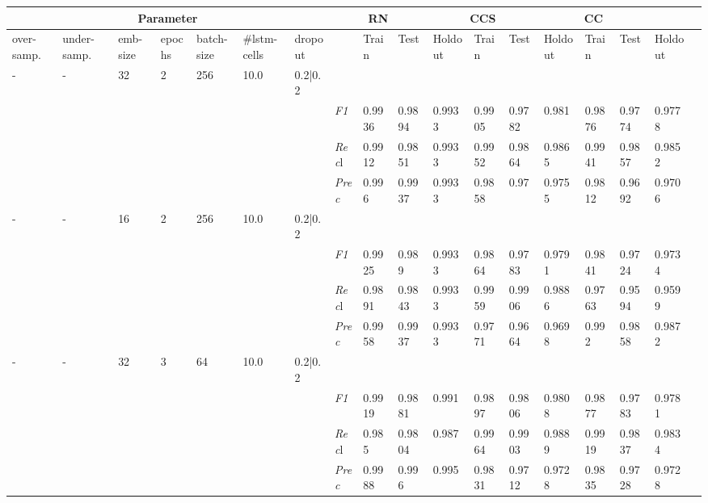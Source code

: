 \begin{table}[]
\tiny
\tabcolsep=0.11cm
\begin{tabularx}{\textwidth}{XXXXXXX|X|XXX|XXX|XXXX}
\toprule
\multicolumn{7}{c}{Parameter} & \multicolumn{3}{c}{RN} & \multicolumn{3}{c}{CCS} & \multicolumn{3}{c}{CC} \\ \midrule
over-\newline samp. & under-\newline samp. & emb-\newline size & epochs &batch-\newline size & \#lstm-\newline cells & dropout & & Train &  Test & Holdout & Train &  Test & Holdout & Train &  Test & Holdout \\ \midrule
- & - & 32 & 2 & 256 &10.0 & 0.2|0.2 & & & & & & & & & \\
& & & & & & & \textit{F1} & 0.9936 & 0.9894 & 0.9933 & 0.9905 & 0.9782        & 0.981        & 0.9876        & 0.9774        & 0.9778        \\
& & & & & & & \textit{Rec}l & 0.9912 & 0.9851 & 0.9933    & 0.9952 & 0.9864    & 0.9865    & 0.9941    & 0.9857    & 0.9852    \\
& & & & & & & \textit{Prec} & 0.996 & 0.9937 & 0.9933 & 0.9858 & 0.97 & 0.9755 & 0.9812 & 0.9692 & 0.9706 \\ \midrule
- & - & 16 & 2 & 256 &10.0 & 0.2|0.2 & & & & & & & & & \\
& & & & & & & \textit{F1} & 0.9925 & 0.989 & 0.9933 & 0.9864 & 0.9783        & 0.9791        & 0.9841        & 0.9724        & 0.9734        \\
& & & & & & & \textit{Rec}l & 0.9891 & 0.9843 & 0.9933    & 0.9959 & 0.9906    & 0.9886    & 0.9763    & 0.9594    & 0.9599    \\
& & & & & & & \textit{Prec} & 0.9958 & 0.9937 & 0.9933 & 0.9771 & 0.9664 & 0.9698 & 0.992 & 0.9858 & 0.9872 \\ \midrule
- & - & 32 & 3 & 64 &10.0 & 0.2|0.2 & & & & & & & & & \\
& & & & & & & \textit{F1} & 0.9919 & 0.9881 & 0.991 & 0.9897 & 0.9806        & 0.9808        & 0.9877        & 0.9783        & 0.9781        \\
& & & & & & & \textit{Rec}l & 0.985 & 0.9804 & 0.987    & 0.9964 & 0.9903    & 0.9889    & 0.9919    & 0.9837    & 0.9834    \\
& & & & & & & \textit{Prec} & 0.9988 & 0.996 & 0.995 & 0.9831 & 0.9712 & 0.9728 & 0.9835 & 0.9728 & 0.9728 \\ \midrule

\end{tabularx}
\end{table}
